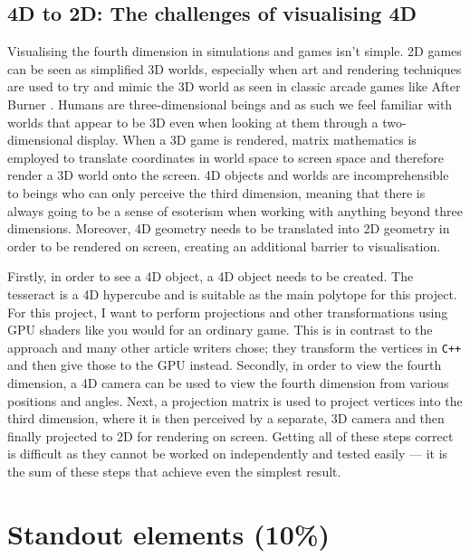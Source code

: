 \documentclass[11pt, a4paper]{article}
\begin{document}
\subsection{4D to 2D: The challenges of visualising 4D}
\label{subsec:challenges}

Visualising the fourth dimension in simulations and games isn't simple. 2D games can be seen as simplified 3D worlds, especially when art and rendering techniques are used to try and mimic the 3D world as seen in classic arcade games like After Burner \parencite{afterburner}. Humans are three-dimensional beings and as such we feel familiar with worlds that appear to be 3D even when looking at them through a two-dimensional display. When a 3D game is rendered, matrix mathematics is employed to translate coordinates in world space to screen space and therefore render a 3D world onto the screen. 4D objects and worlds are incomprehensible to beings who can only perceive the third dimension, meaning that there is always going to be a sense of esoterism when working with anything beyond three dimensions. Moreover, 4D geometry needs to be translated into 2D geometry in order to be rendered on screen, creating an additional barrier to visualisation.

Firstly, in order to see a 4D object, a 4D object needs to be created. The tesseract is a 4D hypercube and is suitable as the main polytope for this project. For this project, I want to perform projections and other transformations using GPU shaders like you would for an ordinary game. This is in contrast to the approach \citeauthor*{hollasch1991four} \parencite*{hollasch1991four} and many other article writers chose; they transform the vertices in \texttt{C++} and then give those to the GPU instead. Secondly, in order to view the fourth dimension, a 4D camera can be used to view the fourth dimension from various positions and angles. Next, a projection matrix is used to project vertices into the third dimension, where it is then perceived by a separate, 3D camera and then finally projected to 2D for rendering on screen. Getting all of these steps correct is difficult as they cannot be worked on independently and tested easily --- it is the sum of these steps that achieve even the simplest result. 

\section{Standout elements (10\%)}
\label{sec:standoutElements}
\end{document}

